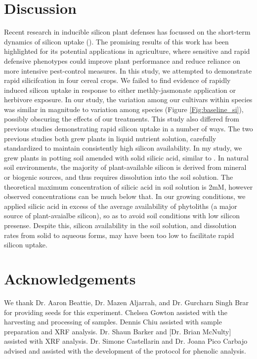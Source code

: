 \documentclass[12pt, letterpaper, ]{report}
\begin{document}
\section{Discussion}

Recent research in inducible silicon plant defenses has focussed on the short-term dynamics of silicon uptake (\cite{waterman_short-term_2021,waterman_short-term_2021-1}). The promising results of this work has been highlighted for its potential applications in agriculture, where sensitive and rapid defensive phenotypes could improve plant performance and reduce reliance on more intensive pest-control measures. In this study, we attempted to demonstrate rapid silicifcation in four cereal crops. We failed to find evidence of rapidly induced silicon uptake in response to either methly-jasmonate application or herbivore exposure. In our study, the variation among our cultivars within species was similar in magnitude to variation among species (Figure \ref{Fig:baseline_si}), possibly obscuring the effects of our treatments. This study also differed from previous studies demonstrating rapid silicon uptake in a number of ways. The two previous studies both grew plants in liquid nutrient solution, carefully standardized to maintain consistently high silicon availability. In my study, we grew plants in potting soil amended with solid silicic acid, similar to \textcite{nascimento_silicon_2019}. In natural soil environments, the majority of plant-available silicon is derived from mineral or biogenic sources, and thus requires dissolution into the soil solution. The theoretical maximum concentration of silicic acid in soil solution is 2mM, however observed concentrations can be much below that. In our growing conditions, we applied silicic acid in excess of the average availability of phytoliths (a major source of plant-avaialbe silicon), so as to avoid soil conditions with low silicon presense. Despite this, silicon availability in the soil solution, and dissolution rates from solid to aqueous forms, may have been too low to facilitate rapid silicon uptake. 

\section{Acknowledgements}

We thank Dr. Aaron Beattie, Dr. Mazen Aljarrah, and Dr. Gurcharn Singh Brar for providing seeds for this experiment. Chelsea Gowton assisted with the harvesting and processing of samples. Dennis Chiu assisted with sample preparation and XRF analysis. Dr. Shaun Barker and [Dr. Brian McNulty] assisted with XRF analysis. Dr. Simone Castellarin and Dr. Joana Pico Carbajo advised and assisted with the development of the protocol for phenolic analysis. 
\end{document}
